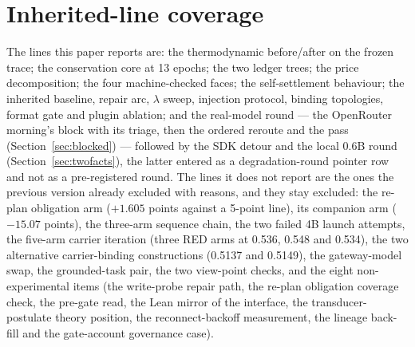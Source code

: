 \documentclass[11pt,a4paper]{article}
\begin{document}
\section{Inherited-line coverage}
\label{app:coverage}
The lines this paper reports are: the thermodynamic before/after on the frozen trace; the conservation core at 13 epochs; the two ledger trees; the price decomposition; the four machine-checked faces; the self-settlement behaviour; the inherited baseline, repair arc, $\lambda$ sweep, injection protocol, binding topologies, format gate and plugin ablation; and the real-model round --- the OpenRouter morning's block with its triage, then the ordered reroute and the pass (Section~\ref{sec:blocked}) --- followed by the SDK detour and the local 0.6B round (Section~\ref{sec:twofacts}), the latter entered as a degradation-round pointer row and not as a pre-registered round. The lines it does not report are the ones the previous version already excluded with reasons, and they stay excluded: the re-plan obligation arm ($+1.605$ points against a 5-point line), its companion arm ($-15.07$ points), the three-arm sequence chain, the two failed 4B launch attempts, the five-arm carrier iteration (three RED arms at 0.536, 0.548 and 0.534), the two alternative carrier-binding constructions (0.5137 and 0.5149), the gateway-model swap, the grounded-task pair, the two view-point checks, and the eight non-experimental items (the write-probe repair path, the re-plan obligation coverage check, the pre-gate read, the Lean mirror of the interface, the transducer-postulate theory position, the reconnect-backoff measurement, the lineage back-fill and the gate-account governance case).
\end{document}

